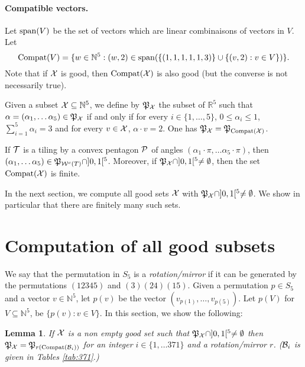 \documentclass[11pt]{article}
\newtheorem{lemma}[theorem]{Lemma}
\theoremstyle{definition}
\begin{document}
\paragraph{Compatible vectors.} %
Let $\operatorname{span}(V)$ be the set of vectors which are linear combinaisons of vectors in $V$.
Let $$\operatorname{Compat}(V)=\{ w \in \mathbb{N}^5 : (w,2) \in \operatorname{span}(\{(1,1,1,1,1,3)\} \cup \{ (v,2) : v\in V \}) \}.$$
Note that if $\mathcal{X}$ is good, then $\operatorname{Compat}(\mathcal{X})$ is also good (but the converse is not necessarily true).

Given a subset $\mathcal{X}\subseteq \mathbb{N}^5$, we define by $\mathfrak{P}_{\mathcal{X}}$ the subset of $\mathbb{R}^5$ such that $\alpha=(\alpha_1,\ldots \alpha_5) \in \mathfrak{P}_{\mathcal{X}}$ if and only if for every $i\in\{1,\ldots, 5\}$, $0 \le \alpha_i \le 1$, $\sum_{i=1}^5 \alpha_i = 3$ and for every $v\in \mathcal{X}$, $\alpha\cdot v=2$.
One has $\mathfrak{P}_{\mathcal{X}} = \mathfrak{P}_{\operatorname{Compat}(\mathcal{X})}$.

If $\mathcal{T}$ is a tiling by a convex pentagon $\mathcal{P}$ of angles $(\alpha_1\cdot \pi,\ldots \alpha_5\cdot \pi)$, then $({\alpha_1},\ldots {\alpha_5})\in \mathfrak{P}_{{{\mathcal{W}}^c}(T)} \cap ]0,1[^5$.
Moreover, if $\mathfrak{P}_{\mathcal{X}} \cap ]0,1[^5 \ne \emptyset$, then the set $\operatorname{Compat}(\mathcal{X})$ is finite.

%
In the next section, we compute all good sets $\mathcal{X}$ with $\mathfrak{P}_{\mathcal{X}} \cap ]0,1[^5 \ne \emptyset$. We show in particular that there are finitely many such sets.
    
\section{Computation of all good subsets}\label{sec:371}

\def\genset{\mB}

%
%

We say that the permutation in $S_5$ is a \emph{rotation/mirror} if it can be generated by the permutations $(12345)$ and $(3)(24)(15)$.
Given a permutation $p\in S_5$ and a vector $v\in \mathbb{N}^5$, let $p(v)$ be the vector $(v_{p(1)},\ldots, v_{p(5)})$. Let $p(V)$ for $V\subseteq \mathbb{N}^5$, be $\{ p(v) : v\in V \}$.
In this section, we show the following:
\begin{lemma}\label{lem:371}
  If $\mathcal{X}$ is a non empty good set such that $\mathfrak{P}_{\mathcal{X}}\cap ]0,1[^5\ne \emptyset$ then $\poly_{\mX} = \poly_{r(\compat(\genset_i))}$ for an integer $i\in \{1,\dots 371\}$ and a rotation/mirror $r$. ($\genset_i$ is given in Tables \ref{tab:371}.)
\end{lemma}

{

}
\end{document}
